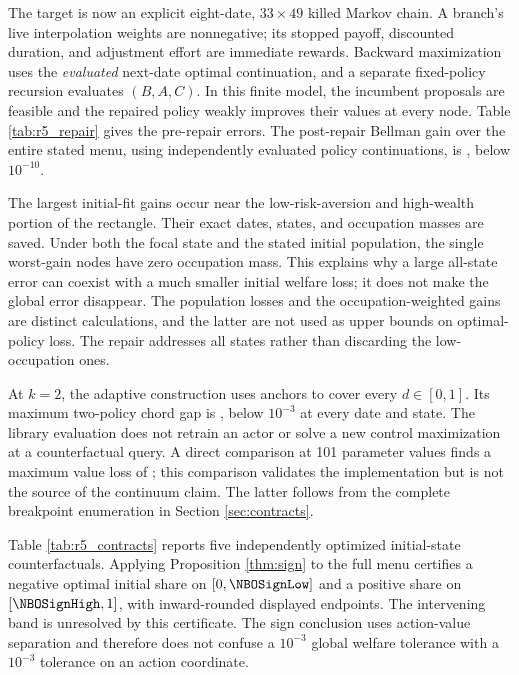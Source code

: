 The target is now an explicit eight-date, $33\times49$ killed Markov chain. A branch's live interpolation weights are nonnegative; its stopped payoff, discounted duration, and adjustment effort are immediate rewards. Backward maximization uses the \emph{evaluated} next-date optimal continuation, and a separate fixed-policy recursion evaluates $(B,A,C)$. In this finite model, the incumbent proposals are feasible and the repaired policy weakly improves their values at every node. Table \ref{tab:r5_repair} gives the pre-repair errors. The post-repair Bellman gain over the entire stated menu, using independently evaluated policy continuations, is \NBORepairGain{}, below $10^{-10}$.


The largest initial-fit gains occur near the low-risk-aversion and high-wealth portion of the rectangle. Their exact dates, states, and occupation masses are saved. Under both the focal state and the stated initial population, the single worst-gain nodes have zero occupation mass. This explains why a large all-state error can coexist with a much smaller initial welfare loss; it does not make the global error disappear. The population losses and the occupation-weighted gains are distinct calculations, and the latter are not used as upper bounds on optimal-policy loss. The repair addresses all states rather than discarding the low-occupation ones.

At $k=2$, the adaptive construction uses \NBOAnchors{} anchors to cover every $d\in[0,1]$. Its maximum two-policy chord gap is \NBOCertificate{}, below $10^{-3}$ at every date and state. The library evaluation does not retrain an actor or solve a new control maximization at a counterfactual query. A direct comparison at 101 parameter values finds a maximum value loss of \NBOContractObservedLoss{}; this comparison validates the implementation but is not the source of the continuum claim. The latter follows from the complete breakpoint enumeration in Section \ref{sec:contracts}.

Table \ref{tab:r5_contracts} reports five independently optimized initial-state counterfactuals. Applying Proposition \ref{thm:sign} to the full menu certifies a negative optimal initial share on $[0,\NBOSignLow]$ and a positive share on $[\NBOSignHigh,1]$, with inward-rounded displayed endpoints. The intervening band is unresolved by this certificate. The sign conclusion uses action-value separation and therefore does not confuse a $10^{-3}$ global welfare tolerance with a $10^{-3}$ tolerance on an action coordinate.


